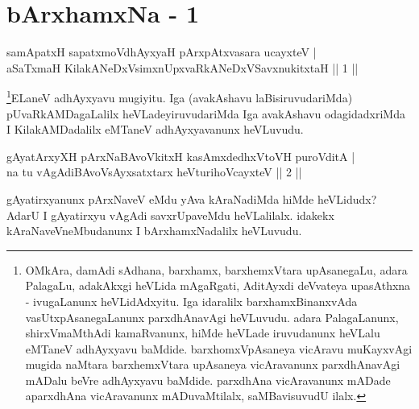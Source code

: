 \chapter{bArxhamxNa - 1}



\begin{shl}
samApatxH sapatxmoV\s dhAyxyaH pArxpAtxvasara ucayxteV | \\
aSaTxmaH KilakANeDxV\s simxnUpxvaRkANeDxVSavxnukitxtaH \hfill|| 1 || 
\end{shl}

\begin{artha} 
\footnote{OMkAra, damAdi sAdhana, barxhamx, barxhemxVtara 
upAsanegaLu, adara PalagaLu, adakAkxgi heVLida mAgaRgati, AditAyxdi 
deVvateya upasAthxna - ivugaLanunx heVLidAdxyitu. Iga idaralilx 
barxhamxBinanxvAda vasUtxpAsanegaLanunx parxdhAnavAgi heVLuvudu. adara 
PalagaLanunx, shirxVmaMthAdi kamaRvanunx, hiMde heVLade iruvudanunx heVLalu 
eMTaneV adhAyxyavu baMdide. barxhomxVpAsaneya vicAravu muKayxvAgi 
mugida naMtara barxhemxVtara upAsaneya vicAravanunx parxdhAnavAgi 
mADalu beVre adhAyxyavu baMdide. parxdhAna vicAravanunx mADade 
aparxdhAna vicAravanunx mADuvaMtilalx, saMBavisuvudU ilalx.}ELaneV adhAyxyavu mugiyitu. Iga (avakAshavu 
laBisiruvudariMda) pUvaRkAMDagaLalilx heVLadeyiruvudariMda Iga 
avakAshavu odagidadxriMda I KilakAMDadalilx eMTaneV adhAyxyavanunx 
heVLuvudu.
\end{artha}


\begin{shl}
gAyatArxyXH pArxNaBAvoVkitxH kasAmxdedhxVtoVH puroVditA | \\
na tu vAgAdiBAvoV\s sAyxsatxtarx heVturihoVcayxteV \hfill|| 2 || 
\end{shl}

\begin{artha} 
gAyatirxyanunx pArxNaveV eMdu yAva kAraNadiMda hiMde heVLidudx? AdarU 
I gAyatirxyu vAgAdi savxrUpaveMdu heVLalilalx. idakekx 
kAraNaveVneMbudanunx I bArxhamxNadalilx heVLuvudu.
\end{artha}

